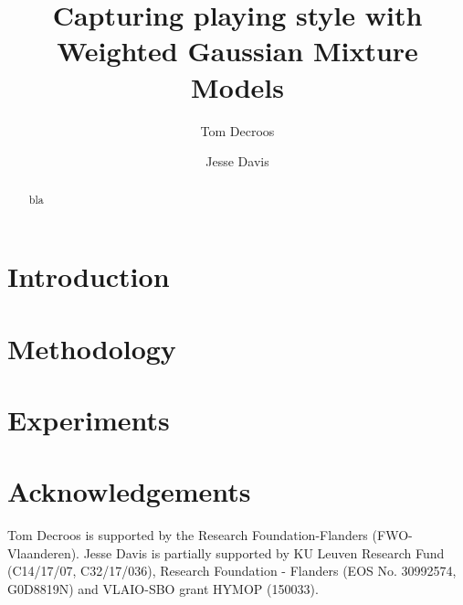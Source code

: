 \documentclass[runningheads]{llncs}
\title{Capturing playing style with Weighted Gaussian Mixture Models}
\author{Tom Decroos \and Jesse Davis}
\institute{KU Leuven, Department of Computer Science}
\date{}
\begin{document}
\maketitle

\begin{abstract}
	bla
\end{abstract}

\section{Introduction}

\section{Methodology}
\section{Experiments}
\section*{Acknowledgements}
Tom Decroos is supported by the Research Foundation-Flanders
(FWO-Vlaanderen). Jesse Davis is partially supported by KU Leuven Research Fund (C14/17/07, C32/17/036), Research Foundation - Flanders (EOS No. 30992574, G0D8819N) and VLAIO-SBO grant HYMOP (150033).



\end{document}
